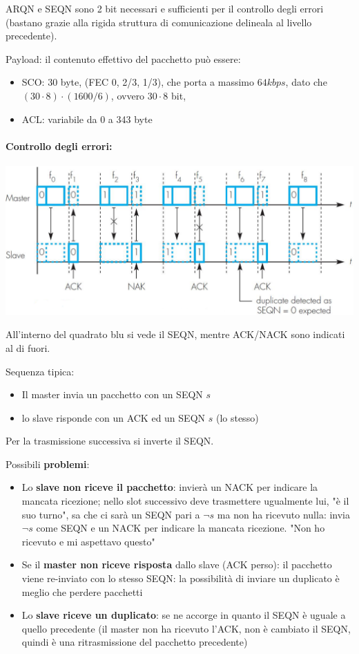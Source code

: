 ARQN e SEQN sono 2 bit necessari e sufficienti per il controllo degli errori (bastano grazie alla rigida struttura di comunicazione delineala al livello precedente).

Payload: il contenuto effettivo del pacchetto può essere: 
\begin{itemize}
	\item SCO: 30 byte,  (FEC 0, 2/3, 1/3), che porta a massimo $64kbps$, dato che $(30 \cdot 8) \cdot (1600/6)$, ovvero $30 \cdot 8$ bit, 
	
    \item ACL: variabile da 0 a 343 byte
\end{itemize}

\paragraph{Controllo degli errori: }
\begin{center}
	\includegraphics[width=0.9\linewidth]{img/wpan/errorcorr1}
\end{center}

All'interno del quadrato blu si vede il SEQN, mentre ACK/NACK sono indicati al di fuori.

Sequenza tipica:
\begin{itemize}
	\item Il master invia un pacchetto con un SEQN $s$

	\item lo slave risponde con un ACK ed un SEQN $s$ (lo stesso)
\end{itemize}
Per la trasmissione successiva si inverte il SEQN.

Possibili \textbf{problemi}: 
\begin{itemize}
	\item Lo \textbf{slave non riceve il pacchetto}: invierà un NACK per indicare la mancata ricezione; nello slot successivo deve trasmettere ugualmente lui, "è il suo turno", sa che ci sarà un SEQN pari a $\neg s$ ma non ha ricevuto nulla: invia $\neg s$ come SEQN e un NACK per indicare la mancata ricezione. "Non ho ricevuto e mi aspettavo questo"
    
	\item Se il \textbf{master non riceve risposta} dallo slave (ACK perso): il pacchetto viene re-inviato con lo stesso SEQN: la possibilità di inviare un duplicato è meglio che perdere pacchetti
	
    \item Lo \textbf{slave riceve un duplicato}: se ne accorge in quanto il SEQN è uguale a quello precedente (il master non ha ricevuto l'ACK, non è cambiato il SEQN, quindi è una ritrasmissione del pacchetto precedente)
\end{itemize}

